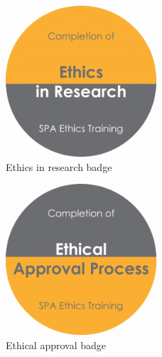 \label{sec:Appendix 2}

\begin{figure}[htbp]
    \centering
    \includegraphics[width=0.5\textwidth]{images/ethics-in-research-badge.png}
    \caption{Ethics in research badge}
\end{figure}

\begin{figure}[htbp]
    \centering
    \includegraphics[width=0.5\textwidth]{images/ethical-approval-process-badge.png}
    \caption{Ethical approval badge}
\end{figure}

